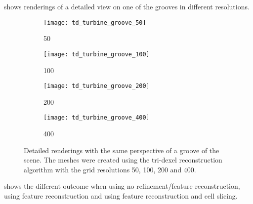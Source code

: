  shows renderings of a detailed view on one of the grooves in different resolutions.

\begin{figure}
	\centering
	\begin{subfigure}[b]{0.24\textwidth}
		\centering
		\texttt{[image: td\_turbine\_groove\_50]}
		\caption{50}
		\label{fig:td_turbine_groove_50}
	\end{subfigure}
	\begin{subfigure}[b]{0.24\textwidth}
		\centering
		\texttt{[image: td\_turbine\_groove\_100]}
		\caption{100}
		\label{fig:td_turbine_groove_100}
	\end{subfigure}
	\begin{subfigure}[b]{0.24\textwidth}
		\centering
		\texttt{[image: td\_turbine\_groove\_200]}
		\caption{200}
		\label{fig:td_turbine_groove_200}
	\end{subfigure}
	\begin{subfigure}[b]{0.24\textwidth}
		\centering
		\texttt{[image: td\_turbine\_groove\_400]}
		\caption{400}
		\label{fig:td_turbine_groove_400}
	\end{subfigure}
	\caption[Tri-dexel \turbine grooves]{
		Detailed renderings with the same perspective of a groove of the \turbine scene.
		The meshes were created using the tri-dexel reconstruction algorithm with the grid resolutions 50, 100, 200 and 400.
	}
	\label{fig:td_grooves}
\end{figure}

 shows the different outcome when using no refinement/feature reconstruction, using feature reconstruction and using feature reconstruction and cell slicing.

